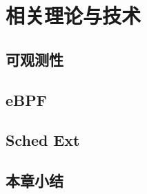 \chapter{相关理论与技术}\label{chap:theories_tech}

\section{可观测性}

\section{eBPF}

\section{Sched Ext}

\section{本章小结}